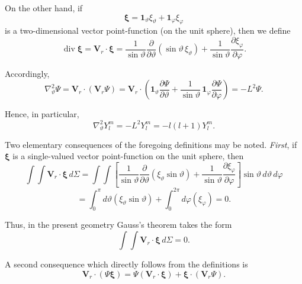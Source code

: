 On the other hand, if
\begin{equation}
\label{eq:A3-22}
\boldsymbol{\xi} = \mathbf{1}_\vartheta \xi_\vartheta + \mathbf{1}_\varphi \xi_\varphi
\end{equation}
is a two-dimensional vector point-function (on the unit sphere), then we define
\begin{equation}
\label{eq:A3-23}
\operatorname{div}\boldsymbol{\xi} = \mathbf{V}_r \cdot \boldsymbol{\xi} = \frac{1}{\sin\vartheta}\frac{\partial}{\partial\vartheta}(\sin\vartheta\,\xi_\vartheta) + \frac{1}{\sin\vartheta}\frac{\partial\xi_\varphi}{\partial\varphi}.
\end{equation}

Accordingly,
\begin{equation}
\label{eq:A3-24}
\nabla^2_\vartheta\Psi = \mathbf{V}_r \cdot (\mathbf{V}_r\Psi) = \mathbf{V}_r \cdot \left( \mathbf{1}_\vartheta \frac{\partial\Psi}{\partial\vartheta} + \frac{1}{\sin\vartheta}\,\mathbf{1}_\varphi \frac{\partial\Psi}{\partial\varphi} \right) = -L^2\Psi.
\end{equation}

Hence, in particular,
\begin{equation}
\label{eq:A3-25}
\nabla^2_\vartheta Y_l^m = -L^2 Y_l^m = -l(l+1) Y_l^m.
\end{equation}

Two elementary consequences of the foregoing definitions may be noted. \emph{First}, if $\boldsymbol{\xi}$ is a single-valued vector point-function on the unit sphere, then
\begin{equation}
\label{eq:A3-26}
\int\!\!\int \mathbf{V}_r \cdot \boldsymbol{\xi} \, d\Sigma = \int\!\!\int \left[ \frac{1}{\sin\vartheta}\frac{\partial}{\partial\vartheta}(\xi_\vartheta \sin\vartheta) + \frac{1}{\sin\vartheta}\frac{\partial\xi_\varphi}{\partial\varphi} \right] \sin\vartheta \, d\vartheta \, d\varphi
\end{equation}
\[
= \int_0^\pi d\vartheta (\xi_\vartheta \sin\vartheta) + \int_0^{2\pi} d\varphi (\xi_\varphi) = 0.
\]

Thus, in the present geometry Gauss's theorem takes the form
\begin{equation}
\label{eq:A3-27}
\int\!\!\int \mathbf{V}_r \cdot \boldsymbol{\xi} \, d\Sigma = 0.
\end{equation}

A second consequence which directly follows from the definitions is
\begin{equation}
\label{eq:A3-28}
\mathbf{V}_r \cdot (\Psi\boldsymbol{\xi}) = \Psi(\mathbf{V}_r \cdot \boldsymbol{\xi}) + \boldsymbol{\xi} \cdot (\mathbf{V}_r\Psi).
\end{equation}

